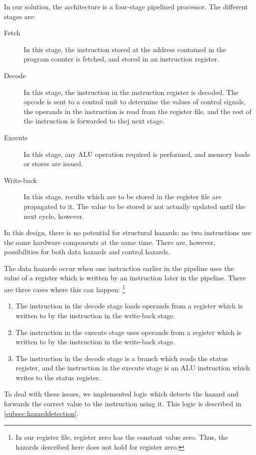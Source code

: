 \documentclass[11pt]{article}
\begin{document}
In our solution, the architecture is a four-stage pipelined
processor. The different stages are:
\begin{description}
\item[Fetch] In this stage, the instruction stored at the address
  contained in the program counter is fetched, and stored in an
  instruction register.
\item[Decode] In this stage, the instruction in the instruction
  register is decoded. The opcode is sent to a control unit to
  determine the values of control signals, the operands in the
  instruction is read from the register file, and the rest of the
  instruction is forwarded to thej next stage. 
\item[Execute] In this stage, any ALU operation required is performed,
  and memory loads or stores are issued.
\item[Write-back] In this stage, results which are to be stored in the
  register file are propagated to it. The value to be stored is not
  actually updated until the next cycle, however.
\end{description}
In this design, there is no potential for structural hazards: no two
instructions use the same hardware components at the same time. There
are, however, possibilities for both data hazards and control hazards. 

The data hazards occur when one instruction earlier in the pipeline
uses the value of a register which is written by an instruction later
in the pipeline. There are three cases where this can happen:
\footnote{In our register file, register zero has the constant value
  zero. Thus, the hazards described here does not hold for register
  zero.}
\begin{enumerate}
\item The instruction in the decode stage loads operands from a
  register which is written to by the instruction in the write-back
  stage. 
\item The instruction in the execute stage uses operands from a
  register which is written to by the instruction in the write-back
  stage.
\item The instruction in the decode stage is a branch which reads the
  status register, and the instruction in the execute stage is an ALU
  instruction which writes to the status register.
\end{enumerate}
To deal with these issues, we implemented logic which detects the
hazard and forwards the correct value to the instruction using
it. This logic is described in \autoref{subsec:hazarddetection}.
\end{document}

